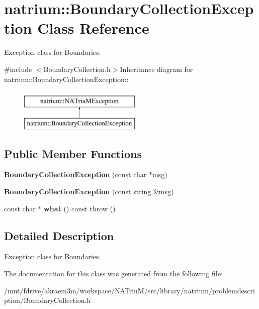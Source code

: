 \hypertarget{classnatrium_1_1BoundaryCollectionException}{
\section{natrium::BoundaryCollectionException Class Reference}
\label{classnatrium_1_1BoundaryCollectionException}
}


Exception class for Boundaries.  


{\ttfamily \#include $<$BoundaryCollection.h$>$}Inheritance diagram for natrium::BoundaryCollectionException::\begin{figure}[H]
\begin{center}
\leavevmode
\includegraphics[height=2cm]{classnatrium_1_1BoundaryCollectionException}
\end{center}
\end{figure}
\subsection*{Public Member Functions}
\begin{DoxyCompactItemize}
\item 
\hypertarget{classnatrium_1_1BoundaryCollectionException_a287b6b5f5391b2c6457013e55f01b53e}{
{\bfseries BoundaryCollectionException} (const char $\ast$msg)}
\label{classnatrium_1_1BoundaryCollectionException_a287b6b5f5391b2c6457013e55f01b53e}

\item 
\hypertarget{classnatrium_1_1BoundaryCollectionException_a8371424ca0fa0ffb718e82df1401fde1}{
{\bfseries BoundaryCollectionException} (const string \&msg)}
\label{classnatrium_1_1BoundaryCollectionException_a8371424ca0fa0ffb718e82df1401fde1}

\item 
\hypertarget{classnatrium_1_1BoundaryCollectionException_a5e1a7fcec5fdf38baa8bd7ba8418699c}{
const char $\ast$ {\bfseries what} () const   throw ()}
\label{classnatrium_1_1BoundaryCollectionException_a5e1a7fcec5fdf38baa8bd7ba8418699c}

\end{DoxyCompactItemize}


\subsection{Detailed Description}
Exception class for Boundaries. 

The documentation for this class was generated from the following file:\begin{DoxyCompactItemize}
\item 
/mnt/fdrive/akraem3m/workspace/NATriuM/src/library/natrium/problemdescription/BoundaryCollection.h\end{DoxyCompactItemize}
